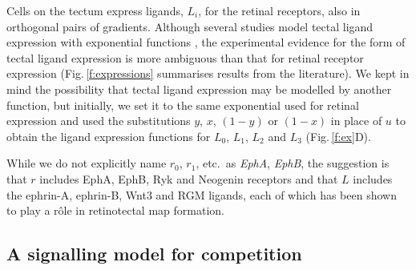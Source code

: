 \documentclass[11pt, a4paper]{article}
\begin{document}
Cells on the tectum express ligands, $L_i$, for the retinal receptors, also in orthogonal pairs of gradients.
Although several studies model tectal ligand expression with exponential functions \citep{koulakov_stochastic_2004}, the experimental evidence for the form of tectal ligand expression is more ambiguous than that for retinal receptor expression (Fig.\,\ref{f:expressions} summarises results from the literature).
We kept in mind the possibility that tectal ligand expression may be modelled by another function, but initially, we set it to the same exponential used for retinal expression and used the substitutions $y$, $x$, $(1-y)$ or $(1-x)$ in place of $u$ to obtain the ligand expression functions for $L_0$, $L_1$, $L_2$ and $L_3$ (Fig.\,\ref{f:ex}D).

While we do not explicitly name $r_0$, $r_1$, etc.~as \emph{EphA}, \emph{EphB}, the suggestion is that $r$ includes EphA, EphB, Ryk \citep{schmitt_wntryk_2006} and Neogenin \citep{rajagopalan_neogenin_2004} receptors and that $L$ includes the ephrin-A, ephrin-B, Wnt3 \citep{schmitt_wntryk_2006} and RGM \citep{monnier_rgm_2002} ligands, each of which has been shown to play a r\^ole in retinotectal map formation.

\subsection*{A signalling model for competition}
\end{document}
